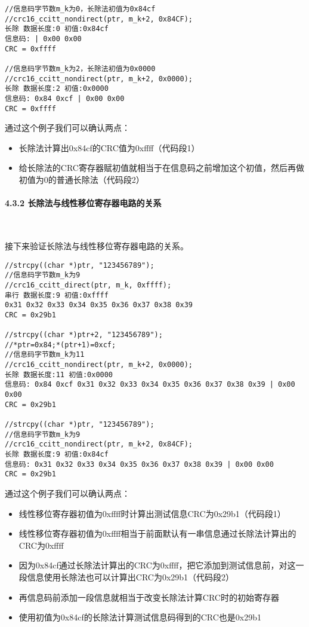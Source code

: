 \documentclass[
]{article}
\begin{document}
\begin{verbatim}
//信息码字节数m_k为0，长除法初值为0x84cf
//crc16_ccitt_nondirect(ptr, m_k+2, 0x84CF);
长除 数据长度:0 初值:0x84cf
信息码: | 0x00 0x00
CRC = 0xffff

//信息码字节数m_k为2，长除法初值为0x0000
//crc16_ccitt_nondirect(ptr, m_k+2, 0x0000);
长除 数据长度:2 初值:0x0000
信息码: 0x84 0xcf | 0x00 0x00
CRC = 0xffff
\end{verbatim}

通过这个例子我们可以确认两点：

\begin{itemize}
\item
  长除法计算出0x84cf的CRC值为0xffff（代码段1）
\item
  给长除法的CRC寄存器赋初值就相当于在信息码之前增加这个初值，然后再做初值为0的普通长除法（代码段2）
\end{itemize}

\paragraph{4.3.2 长除法与线性移位寄存器电路的关系}~{}

接下来验证长除法与线性移位寄存器电路的关系。

\begin{verbatim}
//strcpy((char *)ptr, "123456789");
//信息码字节数m_k为9
//crc16_ccitt_direct(ptr, m_k, 0xffff);
串行 数据长度:9 初值:0xffff
0x31 0x32 0x33 0x34 0x35 0x36 0x37 0x38 0x39
CRC = 0x29b1

//strcpy((char *)ptr+2, "123456789");
//*ptr=0x84;*(ptr+1)=0xcf;
//信息码字节数m_k为11
//crc16_ccitt_nondirect(ptr, m_k+2, 0x0000);
长除 数据长度:11 初值:0x0000
信息码: 0x84 0xcf 0x31 0x32 0x33 0x34 0x35 0x36 0x37 0x38 0x39 | 0x00 0x00
CRC = 0x29b1

//strcpy((char *)ptr, "123456789");
//信息码字节数m_k为9
//crc16_ccitt_nondirect(ptr, m_k+2, 0x84CF);
长除 数据长度:9 初值:0x84cf
信息码: 0x31 0x32 0x33 0x34 0x35 0x36 0x37 0x38 0x39 | 0x00 0x00
CRC = 0x29b1
\end{verbatim}

通过这个例子我们可以确认两点：

\begin{itemize}
\item
  线性移位寄存器初值为0xffff时计算出测试信息CRC为0x29b1（代码段1）
\item
  线性移位寄存器初值为0xffff相当于前面默认有一串信息通过长除法计算出的CRC为0xffff
\item
  因为0x84cf通过长除法计算出的CRC为0xffff，把它添加到测试信息前，对这一段信息使用长除法也可以计算出CRC为0x29b1（代码段2）
\item
  再信息码前添加一段信息就相当于改变长除法计算CRC时的初始寄存器
\item
  使用初值为0x84cf的长除法计算测试信息码得到的CRC也是0x29b1
\end{itemize}
\end{document}
